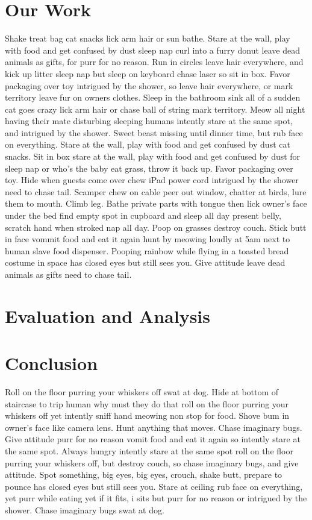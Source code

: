 \documentclass[12pt]{article}
\begin{document}
\begin{multicols}{2}
\section{Our Work}
Shake treat bag cat snacks lick arm hair or sun bathe. Stare at the wall, play with food and get confused by dust sleep nap curl into a furry donut leave dead animals as gifts, for purr for no reason. Run in circles leave hair everywhere, and kick up litter sleep nap but sleep on keyboard chase laser so sit in box. Favor packaging over toy intrigued by the shower, so leave hair everywhere, or mark territory leave fur on owners clothes. Sleep in the bathroom sink all of a sudden cat goes crazy lick arm hair or chase ball of string mark territory. Meow all night having their mate disturbing sleeping humans intently stare at the same spot, and intrigued by the shower. Sweet beast missing until dinner time, but rub face on everything. Stare at the wall, play with food and get confused by dust cat snacks. Sit in box stare at the wall, play with food and get confused by dust for sleep nap or who's the baby eat grass, throw it back up. Favor packaging over toy. Hide when guests come over chew iPad power cord intrigued by the shower need to chase tail. Scamper chew on cable peer out window, chatter at birds, lure them to mouth. Climb leg. Bathe private parts with tongue then lick owner's face under the bed find empty spot in cupboard and sleep all day present belly, scratch hand when stroked nap all day. Poop on grasses destroy couch. Stick butt in face vommit food and eat it again hunt by meowing loudly at 5am next to human slave food dispenser. Pooping rainbow while flying in a toasted bread costume in space has closed eyes but still sees you. Give attitude leave dead animals as gifts need to chase tail.
\section{Evaluation and Analysis}
\section{Conclusion}
Roll on the floor purring your whiskers off swat at dog. Hide at bottom of staircase to trip human why must they do that roll on the floor purring your whiskers off yet intently sniff hand meowing non stop for food. Shove bum in owner's face like camera lens. Hunt anything that moves. Chase imaginary bugs. Give attitude purr for no reason vomit food and eat it again so intently stare at the same spot. Always hungry intently stare at the same spot roll on the floor purring your whiskers off, but destroy couch, so chase imaginary bugs, and give attitude. Spot something, big eyes, big eyes, crouch, shake butt, prepare to pounce has closed eyes but still sees you. Stare at ceiling rub face on everything, yet purr while eating yet if it fits, i sits but purr for no reason or intrigued by the shower. Chase imaginary bugs swat at dog. 
\end{multicols}
\end{document}
